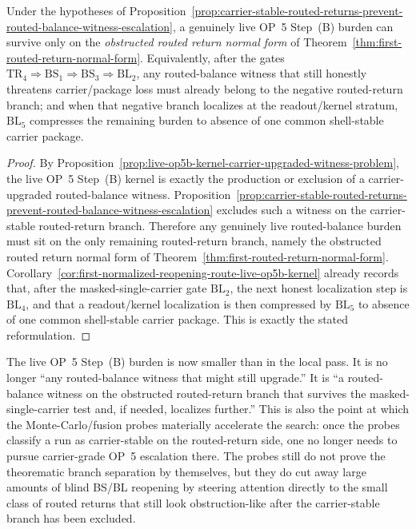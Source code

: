 \begin{corollary}
\label{cor:live-op5b-burden-survives-only-on-obstructed-routed-return-branch}
Under the hypotheses of Proposition~\ref{prop:carrier-stable-routed-returns-prevent-routed-balance-witness-escalation}, a genuinely live OP~5 Step~(B) burden can survive only on the \emph{obstructed routed return normal form} of Theorem~\ref{thm:first-routed-return-normal-form}. Equivalently, after the gates \(\mathrm{TR}_4\Rightarrow\mathrm{BS}_1\Rightarrow\mathrm{BS}_3\Rightarrow\mathrm{BL}_2\), any routed-balance witness that still honestly threatens carrier/package loss must already belong to the negative routed-return branch; and when that negative branch localizes at the readout/kernel stratum, \(\mathrm{BL}_5\) compresses the remaining burden to absence of one common shell-stable carrier package.
\end{corollary}

\begin{proof}
By Proposition~\ref{prop:live-op5b-kernel-carrier-upgraded-witness-problem}, the live OP~5 Step~(B) kernel is exactly the production or exclusion of a carrier-upgraded routed-balance witness. Proposition~\ref{prop:carrier-stable-routed-returns-prevent-routed-balance-witness-escalation} excludes such a witness on the carrier-stable routed-return branch. Therefore any genuinely live routed-balance burden must sit on the only remaining routed-return branch, namely the obstructed routed return normal form of Theorem~\ref{thm:first-routed-return-normal-form}. Corollary~\ref{cor:first-normalized-reopening-route-live-op5b-kernel} already records that, after the masked-single-carrier gate \(\mathrm{BL}_2\), the next honest localization step is \(\mathrm{BL}_4\), and that a readout/kernel localization is then compressed by \(\mathrm{BL}_5\) to absence of one common shell-stable carrier package. This is exactly the stated reformulation.
\end{proof}

\begin{remark}
\label{rem:what-second-op5b-sharpening-buys}
The live OP~5 Step~(B) burden is now smaller than in the local pass. It is no longer ``any routed-balance witness that might still upgrade.'' It is ``a routed-balance witness on the obstructed routed-return branch that survives the masked-single-carrier test and, if needed, localizes further.'' This is also the point at which the Monte-Carlo/fusion probes materially accelerate the search: once the probes classify a run as carrier-stable on the routed-return side, one no longer needs to pursue carrier-grade OP~5 escalation there. The probes still do not prove the theorematic branch separation by themselves, but they do cut away large amounts of blind BS/BL reopening by steering attention directly to the small class of routed returns that still look obstruction-like after the carrier-stable branch has been excluded.
\end{remark}



